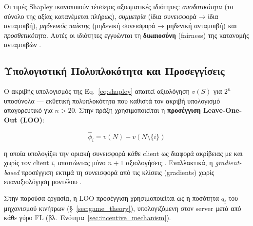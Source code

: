 Οι τιμές Shapley ικανοποιούν τέσσερις αξιωματικές ιδιότητες:
\textit{αποδοτικότητα} (το σύνολο της αξίας κατανέμεται πλήρως),
\textit{συμμετρία} (ίδια συνεισφορά → ίδια ανταμοιβή),
\textit{μηδενικός παίκτης} (μηδενική συνεισφορά → μηδενική ανταμοιβή)
και \textit{προσθετικότητα}. Αυτές οι ιδιότητες εγγυώνται τη
\textbf{δικαιοσύνη} (fairness) της κατανομής ανταμοιβών \cite{Shapley1953}.

\subsection{Υπολογιστική Πολυπλοκότητα και Προσεγγίσεις}
\label{subsec:shapley_approx}

Ο ακριβής υπολογισμός της Eq.~\eqref{eq:shapley} απαιτεί
αξιολόγηση $v(S)$ για $2^n$ υποσύνολα — εκθετική πολυπλοκότητα
που καθιστά τον ακριβή υπολογισμό απαγορευτικό για $n > 20$.
Στην πράξη χρησιμοποιείται η \textbf{προσέγγιση Leave-One-Out (LOO)}:

\begin{equation}
    \label{eq:loo}
    \hat{\phi}_i = v(N) - v(N \setminus \{i\})
\end{equation}

\noindent η οποία υπολογίζει την οριακή συνεισφορά κάθε client
ως διαφορά ακρίβειας με και χωρίς τον client $i$, απαιτώντας μόνο
$n+1$ αξιολογήσεις \cite{Gopinathan2023}. Εναλλακτικά, η
\textit{gradient-based} προσέγγιση εκτιμά τη συνεισφορά από τις
κλίσεις (gradients) χωρίς επαναξιολόγηση μοντέλου \cite{Pavlidis2021}.

Στην παρούσα εργασία, η LOO προσέγγιση χρησιμοποιείται ως η
ποσότητα $q_i$ του μηχανισμού κινήτρων (§~\ref{sec:game_theory}),
υπολογιζόμενη στον server μετά από κάθε γύρο FL
(βλ.\ Ενότητα~\ref{sec:incentive_mechanism}).
